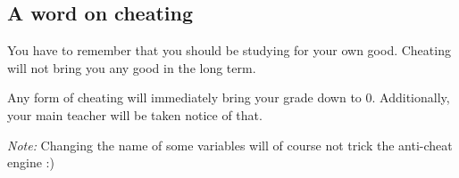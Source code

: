 \documentclass[12pt]{article}
\begin{document}
\subsection{A word on cheating}

You have to remember that you should be studying for your own good. Cheating will not bring you any good in the long term.

Any form of cheating will immediately bring your grade down to 0. Additionally, your main teacher will be taken notice of that.

\textit{Note:} Changing the name of some variables will of course not trick the anti-cheat engine :)
\end{document}
